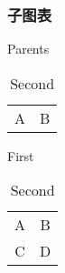 \documentclass[twoside]{ctexart}
\begin{document}
        \subsubsection{子图表}
            \begin{table}
                \renewcommand{\thesubtable}{(\alph{subtable})}
                \captionsetup[sub]{labelformat=simple}
                \renewcommand{\subtablename}{子表}
                \renewcommand{\subtableautorefname}{子表}
                \caption{Parents}
                \begin{subtable}[b]{.5\linewidth}
                    \centering
                    \begin{tabular}{|c|c|}
                        A&B\\
                    \end{tabular}
                    \caption{First}\label{subtbl1}
                \end{subtable} 
                \begin{subtable}[b]{.5\linewidth}
                    \centering
                    \begin{tabular}{|c|c|}
                        A&B\\
                        C&D\\
                    \end{tabular}
                    \caption{Second}\label{subtbl2}
                \end{subtable}
            \end{table}
\end{document}

